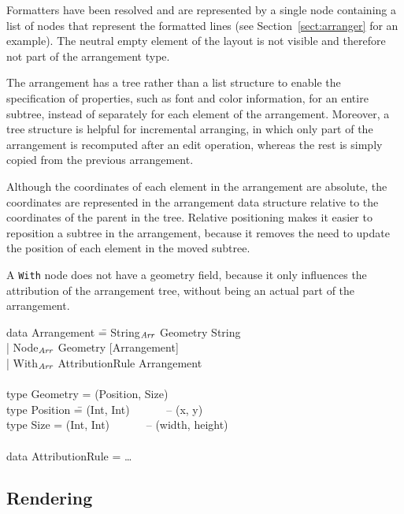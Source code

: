 \documentclass{speauth}
\begin{document}
Formatters have been resolved and are represented by a single node containing a list of nodes that represent the formatted lines (see Section~\ref{sect:arranger} for an example). The neutral empty element of the layout is not visible and therefore not part of the arrangement type.

The arrangement has a tree rather than a list structure to enable the specification of properties, such as font and color information, for an entire subtree, instead of separately for each element of the arrangement. Moreover, a tree structure is helpful for incremental arranging, in which only part of the arrangement is recomputed after an edit operation, whereas the rest is simply copied from the previous arrangement.

Although the coordinates of each element in the arrangement are absolute, the coordinates are represented in the arrangement data structure relative to the coordinates of the parent in the tree. Relative positioning makes it easier to reposition a subtree in the arrangement, because it removes the need to update the position of each element in the moved subtree. 

A \verb|With| node does not have a geometry field, because it only influences the attribution of the arrangement tree, without being an actual part of the arrangement. 


\ttfamily
\begin{tabbing}
data Arrangement \= =  String$_{\mathit{Arr}}$ Geometry String\\
                 \> | Node$_{\mathit{Arr}}$ Geometry [Arrangement]\\
                 \> | With$_{\mathit{Arr}}$ AttributionRule Arrangement\\
\\
type Geometry = (Position, Size)\\
type Position \= = (Int, Int)  ~~~~~~-- (x,  y)\\
type Size      \> = (Int, Int)  ~~~~~~-- (width, height)\\
\\
data AttributionRule = \dots\\
\end{tabbing}
\rmfamily

%																
\subsection{Rendering}
\end{document}
